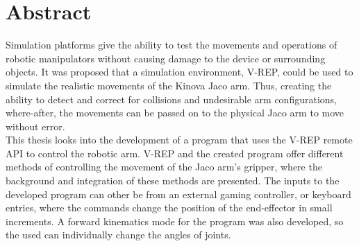 \documentclass[12pt,openany,a4paper]{book}
\begin{document}
\chapter{Abstract}

Simulation platforms give the ability to test the movements and operations of robotic manipulators without causing damage to the device or surrounding objects. It was proposed that a simulation environment, V-REP, could be used to simulate the realistic movements of the Kinova Jaco arm. Thus, creating the ability to detect and correct for collisions and undesirable arm configurations, where-after, the movements can be passed on to the physical Jaco arm to move without error.\\

This thesis looks into the development of a program that uses the V-REP remote API to control the robotic arm. V-REP and the created program offer different methods of controlling the movement of the Jaco arm's gripper, where the background and integration of these methods are presented. The inputs to the developed program can other be from an external gaming controller, or keyboard entries, where the commands change the position of the end-effector in small increments. A forward kinematics mode for the program was also developed, so the used can individually change the angles of joints.\\
\end{document}
